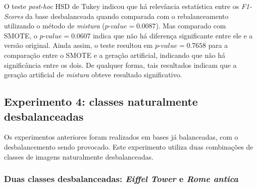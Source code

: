 
O teste \textit{post-hoc} HSD de Tukey indicou que há relevância estatística entre os \textit{F1-Scores} da base desbalanceada quando comparada com o rebalanceamento utilizando o método de \emph{mistura} ($ \textit{p-value} = 0.0087$). Mas comparado com SMOTE, o $\textit{p-value} = 0.0607$ indica que não há diferença significante entre ele e a versão original. Ainda assim, o teste resultou em $\textit{p-value} = 0.7658$ para a comparação entre o SMOTE e a geração artificial, indicando que não há significância entre os dois. De qualquer forma, tais resultados indicam que a geração artificial de \emph{mistura} obteve resultado significativo.

\subsection{Experimento 4: classes naturalmente desbalanceadas}

Os experimentos anteriores foram realizados em bases já balanceadas, com o desbalancemento sendo provocado. Este experimento utiliza duas combinações de classes de imagens naturalmente desbalanceadas.


\subsubsection{Duas classes desbalanceadas: \textit{Eiffel Tower} e \textit{Rome antica}}



